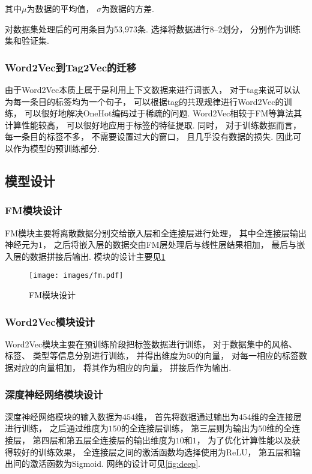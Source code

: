 其中$\mu$为数据的平均值，
$\sigma$为数据的方差.

对数据集处理后的可用条目为53,973条.
选择将数据进行8--2划分，
分别作为训练集和验证集.

\subsubsection{Word2Vec到Tag2Vec的迁移}

由于Word2Vec本质上属于是利用上下文数据来进行词嵌入，
对于tag来说可以认为每一条目的标签均为一个句子，
可以根据tag的共现规律进行Word2Vec的训练，
可以很好地解决OneHot编码过于稀疏的问题.
Word2Vec相较于FM等算法其计算性能较高，
可以很好地应用于标签的特征提取.
同时，
对于训练数据而言，
每一条目的标签不多，
不需要设置过大的窗口，
且几乎没有数据的损失.
因此可以作为模型的预训练部分.

\subsection{模型设计\label{sec:design}}

\subsubsection{FM模块设计}

FM模块主要将离散数据分别交给嵌入层和全连接层进行处理，
其中全连接层输出神经元为$1$，
之后将嵌入层的数据交由FM层处理后与线性层结果相加，
最后与嵌入层的数据拼接后输出.
模块的设计主要见\cref{fig:fm}

\begin{figure}[!htbp]
  \centering
  \texttt{[image: images/fm.pdf]}
  \caption{FM模块设计}\label{fig:fm}
\end{figure}

\subsubsection{Word2Vec模块设计}

Word2Vec模块主要在预训练阶段把标签数据进行训练，
对于数据集中的风格、
标签、
类型等信息分别进行训练，
并得出维度为$50$的向量，
对每一相应的标签数据对应的向量相加，
将其作为相应的向量，
拼接后作为输出.

\subsubsection{深度神经网络模块设计}

深度神经网络模块的输入数据为$454$维，
首先将数据通过输出为$454$维的全连接层进行训练，
之后通过维度为$150$的全连接层训练，
第三层则为输出为$50$维的全连接层，
第四层和第五层全连接层的输出维度为$10$和$1$，
为了优化计算性能以及获得较好的训练效果，
全连接层之间的激活函数均选择使用为ReLU，
第五层和输出间的激活函数为Sigmoid.
网络的设计可见\cref{fig:deep}.

